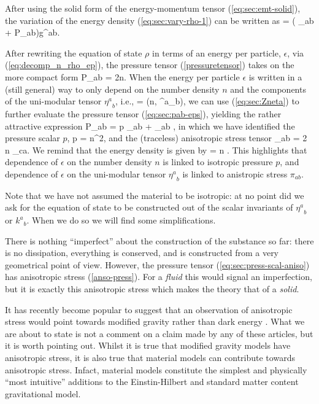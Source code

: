 After using the solid form of the energy-momentum tensor (\ref{eq:sec:emt-solid}), the variation of the energy density (\ref{eq:sec:vary-rho-1}) can be written as
\bea
\lp\rho = \left( \rho \gamma_{ab} + P_{ab}\right)\lp g^{ab}.
\eea


After rewriting the equation of state $\rho$ in terms of an energy per particle, $\epsilon$, via (\ref{eq:decomp_n_rho_ep}),  the pressure tensor (\ref{pressuretensor}) takes on  the more compact form
\bea
\label{eq:sec:pab-eps}
P_{ab} = 2n.
\eea
When the energy per particle $\epsilon$ is written in a (still general) way to only depend on the number density $n$ and the components of the  uni-modular tensor ${\eta^a}_b$, i.e., 
\bea
\epsilon = \epsilon(n, {\eta^a}_b),
\eea
we can use (\ref{eq:sec:Zneta}) to further evaluate the pressure tensor (\ref{eq:sec:pab-eps}), yielding the rather attractive expression
\bea
\label{eq:sec:press-scal-aniso}
P_{ab} = p \gamma_{ab} + \pi_{ab} ,
\eea
in which  we have identified the pressure scalar $p$,
\bse
\bea
\label{iso-ess}
p = n^2,
\eea
and the (traceless) anisotropic stress tensor
\bea
\label{anso-press}
\pi_{ab} = 2 n \eta_{c\langle a}.
\eea
We remind that the energy density is given by
\bea
\rho = n \epsilon.
\eea
\ese
This highlights that dependence of $\epsilon$ on the number density $n$ is linked to isotropic pressure $p$, and dependence of $\epsilon$ on the uni-modular tensor ${\eta^a}_b$ is linked to anistropic stress $\pi_{ab}$.

Note that we have not assumed the material to be isotropic: at no point did we ask for the equation of state to be constructed out of the scalar invariants of ${\eta^a}_b$ or ${k^a}_b$. When we do so we will find some simplifications.

There is nothing ``imperfect'' about the construction of the substance so far: there is no dissipation,   everything is conserved, and is constructed from a very geometrical point of view. However, the pressure tensor (\ref{eq:sec:press-scal-aniso}) has anisotropic stress (\ref{anso-press}). For a \textit{fluid} this would signal an imperfection, but it is exactly this anisotropic stress which makes the theory  that of a  \textit{solid}.

It has recently become popular to suggest that an observation of anisotropic stress would point towards modified gravity rather than dark energy \cite{Bellini:2014fua, Saltas:2014dha, Amendola:2014wma, Linder:2014fna}. What we are about to state is not a comment on a claim made by any of these articles, but it is worth pointing out. Whilst it is true that modified gravity models have anisotropic stress, it is also true that material models can contribute towards anisotropic stress. Infact, material models constitute the simplest and physically ``most intuitive'' additions to the Einstin-Hilbert and standard matter content gravitational model.



